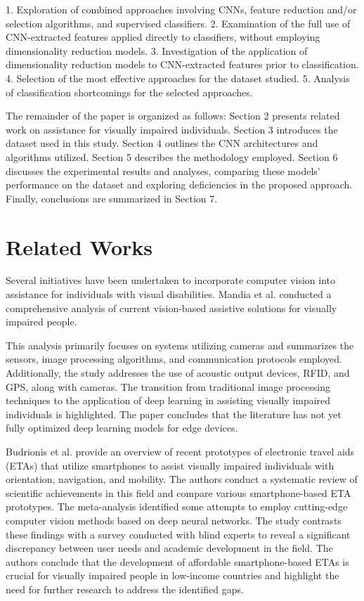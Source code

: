 \documentclass[preprint,12pt,authoryear]{elsarticle}
\begin{document}
1. Exploration of combined approaches involving CNNs, feature reduction and/or selection algorithms, and supervised classifiers.
2. Examination of the full use of CNN-extracted features applied directly to classifiers, without employing dimensionality reduction models.
3. Investigation of the application of dimensionality reduction models to CNN-extracted features prior to classification.
4. Selection of the most effective approaches for the dataset studied.
5. Analysis of classification shortcomings for the selected approaches.

The remainder of the paper is organized as follows: Section 2 presents related work on assistance for visually impaired individuals. Section 3 introduces the dataset used in this study. Section 4 outlines the CNN architectures and algorithms utilized. Section 5 describes the methodology employed. Section 6 discusses the experimental results and analyses, comparing these models' performance on the dataset and exploring deficiencies in the proposed approach. Finally, conclusions are summarized in Section 7. 

\section{Related Works}\label{sec:works}

Several initiatives have been undertaken to incorporate computer vision into assistance for individuals with visual disabilities. Mandia et al. \cite{mandia2023} conducted a comprehensive analysis of current vision-based assistive solutions for visually impaired people.

This analysis primarily focuses on systems utilizing cameras and summarizes the sensors, image processing algorithms, and communication protocols employed. Additionally, the study addresses the use of acoustic output devices, RFID, and GPS, along with cameras. The transition from traditional image processing techniques to the application of deep learning in assisting visually impaired individuals is highlighted. The paper concludes that the literature has not yet fully optimized deep learning models for edge devices.

Budrionis et al. \cite{budrionis2022} provide an overview of recent prototypes of electronic travel aids (ETAs) that utilize smartphones to assist visually impaired individuals with orientation, navigation, and mobility. The authors conduct a systematic review of scientific achievements in this field and compare various smartphone-based ETA prototypes. The meta-analysis identified some attempts to employ cutting-edge computer vision methods based on deep neural networks. The study contrasts these findings with a survey conducted with blind experts to reveal a significant discrepancy between user needs and academic development in the field. The authors conclude that the development of affordable smartphone-based ETAs is crucial for visually impaired people in low-income countries and highlight the need for further research to address the identified gaps.
\end{document}
